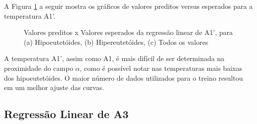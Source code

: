 \documentclass[brazil,tf,epusp]{usp}  %
\begin{document}
A Figura \ref{fig:LR_A1prime} a seguir mostra os gráficos de valores preditos versus esperados para a temperatura A1'.

\begin{figure}[!h]
\caption{Valores preditos x Valores esperados da regressão linear de A1', para (a) Hipoeutetóides, (b) Hipereutetóides, (c) Todos os valores}
\label{fig:LR_A1prime}
\end{figure}

A temperatura A1', assim como A1, é mais difícil de ser determinada na proximidade do campo $\alpha$, como é possível notar nas temperaturas mais baixas dos hipoeutetóides. O maior número de dados utilizados para o treino resultou em um melhor ajuste das curvas.

\subsection{Regressão Linear de A3}
\end{document}
